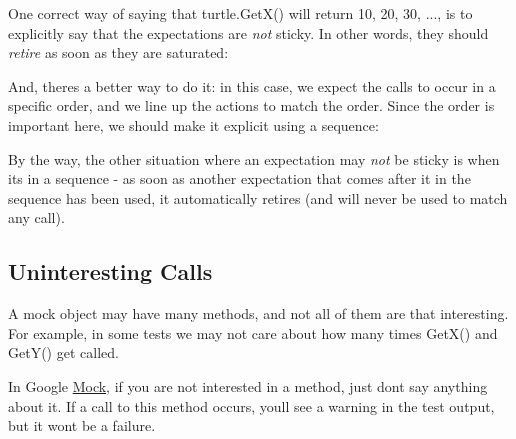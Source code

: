 One correct way of saying that {\ttfamily turtle.\+Get\+X()} will return 10, 20, 30, ..., is to explicitly say that the expectations are {\itshape not} sticky. In other words, they should {\itshape retire} as soon as they are saturated\+:


\begin{DoxyCode}{0}
\DoxyCodeLine{\}}
\end{DoxyCode}


And, there\textquotesingle{}s a better way to do it\+: in this case, we expect the calls to occur in a specific order, and we line up the actions to match the order. Since the order is important here, we should make it explicit using a sequence\+:


\begin{DoxyCode}{0}
\DoxyCodeLine{\{}
\DoxyCodeLine{}
\DoxyCodeLine{  \}}
\DoxyCodeLine{\}}
\end{DoxyCode}


By the way, the other situation where an expectation may {\itshape not} be sticky is when it\textquotesingle{}s in a sequence -\/ as soon as another expectation that comes after it in the sequence has been used, it automatically retires (and will never be used to match any call).

\subsection*{Uninteresting Calls}

A mock object may have many methods, and not all of them are that interesting. For example, in some tests we may not care about how many times {\ttfamily Get\+X()} and {\ttfamily Get\+Y()} get called.

In Google \mbox{\hyperlink{class_mock}{Mock}}, if you are not interested in a method, just don\textquotesingle{}t say anything about it. If a call to this method occurs, you\textquotesingle{}ll see a warning in the test output, but it won\textquotesingle{}t be a failure.

